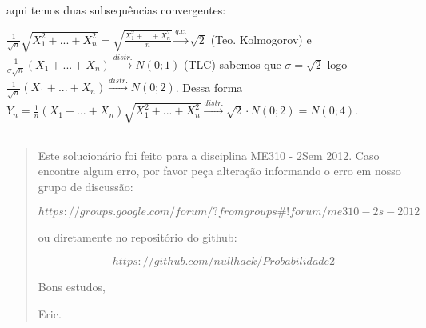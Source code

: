 \documentclass[portuguese]{article}
\begin{document}
aqui temos duas subsequências convergentes:

$\frac{1}{\sqrt{n}}\sqrt{X_{1}^{2}+...+X_{n}^{2}}=\sqrt{\frac{X_{1}^{2}+...+X_{n}^{2}}{n}}\overset{q.c.}{\to}\sqrt{2}$
(Teo. Kolmogorov) e $\frac{1}{\sigma\sqrt{n}}(X_{1}+...+X_{n})\overset{distr.}{\to}N(0;1)$
(TLC) sabemos que $\sigma=\sqrt{2}$ logo $\frac{1}{\sqrt{n}}(X_{1}+...+X_{n})\overset{distr.}{\to}N(0;2)$.
Dessa forma $Y_{n}=\frac{1}{n}(X_{1}+...+X_{n})\sqrt{X_{1}^{2}+...+X_{n}^{2}}\overset{distr.}{\to}\sqrt{2}\cdot N(0;2)=N(0;4)$.


\subsection*{\textcompwordmark{}}


\subsubsection*{\pagebreak{}}
\begin{quotation}
Este solucionário foi feito para a disciplina ME310 - 2Sem 2012. Caso
encontre algum erro, por favor peça alteração informando o erro em
nosso grupo de discussão: 

$$https://groups.google.com/forum/?fromgroups\#!forum/me310-2s-2012$$

ou diretamente no repositório do github:

$$https://github.com/nullhack/Probabilidade2$$

Bons estudos,

Eric.\end{quotation}
\end{document}
